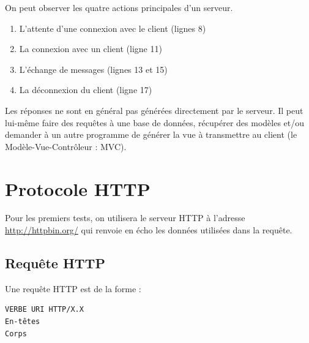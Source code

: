 \vspace{-2ex}
On peut observer les quatre actions principales d'un serveur.

\begin{enumerate}
	\item L'attente d'une connexion avec le client (lignes 8)
	\item La connexion avec un client (ligne 11)
	\item L'échange de messages (lignes 13 et 15)
	\item La déconnexion du client (ligne 17)
\end{enumerate}

Les réponses ne sont en général pas générées directement par le serveur. Il peut lui-même faire des requêtes à une base de données, récupérer des modèles et/ou demander à un autre programme de générer la vue à transmettre au client (le Modèle-Vue-Contrôleur : MVC).

\section{Protocole HTTP}


Pour les premiers tests, on utilisera le serveur HTTP à l'adresse \href{http://httpbin.org/}{http://httpbin.org/} qui renvoie en écho les données utilisées dans la requête.

\subsection{Requête HTTP}

Une requête HTTP est de la forme :

\begin{verbatim}
VERBE URI HTTP/X.X
En-têtes
Corps
\end{verbatim}

